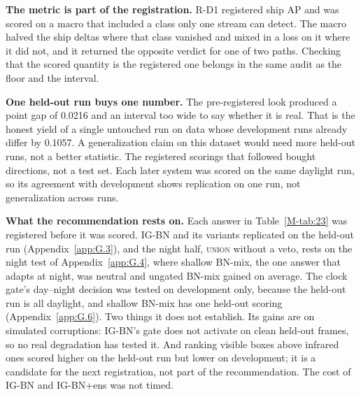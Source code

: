 \documentclass[journal,onecolumn]{IEEEtran}
\begin{document}
\textbf{The metric is part of the registration.} R-D1 registered ship AP and was scored on a macro that included a class only one stream can detect. The macro halved the ship deltas where that class vanished and mixed in a loss on it where it did not, and it returned the opposite verdict for one of two paths. Checking that the scored quantity is the registered one belongs in the same audit as the floor and the interval.

\textbf{One held-out run buys one number.} The pre-registered look produced a point gap of 0.0216 and an interval too wide to say whether it is real. That is the honest yield of a single untouched run on data whose development runs already differ by 0.1057. A generalization claim on this dataset would need more held-out runs, not a better statistic. The registered scorings that followed bought directions, not a test set. Each later system was scored on the same daylight run, so its agreement with development shows replication on one run, not generalization across runs.

\textbf{What the recommendation rests on.} Each answer in Table~\ref{M-tab:23} was registered before it was scored. \mbox{IG-BN} and its variants replicated on the held-out run (Appendix~\ref{app:G.3}), and the night half, \textsc{union} without a veto, rests on the night test of Appendix~\ref{app:G.4}, where shallow BN-mix, the one answer that adapts at night, was neutral and ungated BN-mix gained on average. The clock gate's day--night decision was tested on development only, because the held-out run is all daylight, and shallow BN-mix has one held-out scoring (Appendix~\ref{app:G.6}). Two things it does not establish. Its gains are on simulated corruptions: \mbox{IG-BN}'s gate does not activate on clean held-out frames, so no real degradation has tested it. And ranking visible boxes above infrared ones scored higher on the held-out run but lower on development; it is a candidate for the next registration, not part of the recommendation. The cost of \mbox{IG-BN} and \mbox{IG-BN+ens} was not timed.


\FloatBarrier


\end{document}

